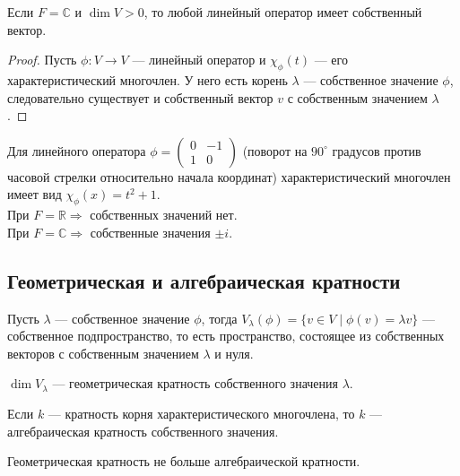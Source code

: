 \begin{Suggestion}
	Если $F = \mathbb{C}$ и $\dim V > 0$, то любой линейный оператор имеет собственный вектор.
\end{Suggestion}

\begin{proof}
	Пусть $\phi: V \to V$ --- линейный оператор и $\chi_\phi(t)$ --- его характеристический многочлен. У него есть корень $\lambda$ --- собственное значение $\phi$, следовательно существует и собственный вектор $v$  с собственным значением $\lambda$.
\end{proof}

\begin{Examples}
	Для линейного оператора $\phi = \begin{pmatrix}
    0& -1 \\
    1& 0
    \end{pmatrix}$
    (поворот на $90^\circ$ градусов против часовой стрелки относительно начала координат) характеристический многочлен имеет вид $\chi_\phi(x) = t^2+1$.
    \\ При $F  = \mathbb{R} \Rightarrow$ собственных значений нет.
    \\ При $F = \mathbb{C} \Rightarrow$ собственные значения $\pm i$.
\end{Examples}

\subsection*{Геометрическая и алгебраическая кратности}

\begin{Def}
	Пусть $\lambda$ --- собственное значение $\phi$, тогда $V_\lambda(\phi) = \{v \in V \; | \; \phi(v) = \lambda v\}$ --- собственное подпространство, то есть пространство, состоящее из собственных векторов с собственным значением $\lambda$ и нуля.
\end{Def}

\begin{Def}
	$\dim V_\lambda$ --- геометрическая кратность собственного значения $\lambda$.
\end{Def}

\begin{Def}
	Если $k$ --- кратность корня характеристического многочлена, то $k$ --- алгебраическая кратность собственного значения.
\end{Def}

\begin{Suggestion}
	Геометрическая кратность не больше алгебраической кратности.
\end{Suggestion}

